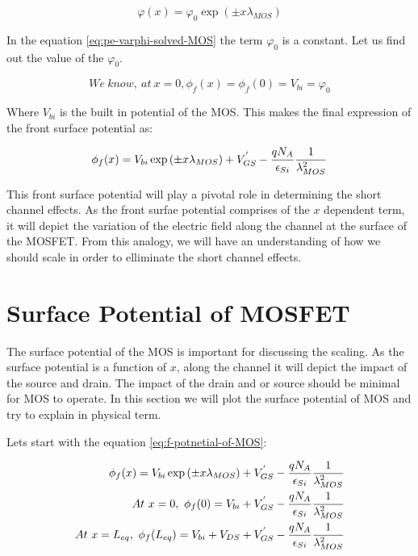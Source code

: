 \documentclass[a4paper]{article}
\begin{document}
\begin{equation}
  \label{eq:pe-varphi-solved-MOS}
  \varphi(x) = \varphi_0 \exp\left({\pm x \lambda_{MOS}}\right)
\end{equation}

In the equation \ref {eq:pe-varphi-solved-MOS} the term $\varphi_0$ is a constant. Let us find out the value of the $\varphi_0$.

\begin{equation}
  \label{eq:varphi-0-vbi}
  We~know,~at~x=0, \phi_f(x)=\phi_f(0)=V_{bi}=\varphi_0
\end{equation}

Where $V_{bi}$ is the built in potential of the MOS. This makes the final expression of the front surface potential as:

\begin{equation}
  \label{eq:f-potnetial-of-MOS}
  \phi_f(x) = V_{bi} \exp \left({\pm x \lambda_{MOS}}\right) + V_{GS}^{'} - \frac{qN_A} {\epsilon_{Si}} \frac{1}{\lambda_{MOS}^2}
\end{equation}

This front surface potential will play a pivotal role in determining the short channel effects. As the front surfae potential comprises of the $x$ dependent term, it will depict the variation of the electric field along the channel at the surface of the MOSFET. From this analogy, we will have an understanding of how we should scale in order to elliminate the short channel effects.

\section{Surface Potential of MOSFET}

The surface potential of the MOS is important for discussing the scaling. As the surface potential is a function of $x$, along the channel it will depict the impact of the source and drain. The impact of the drain and or source should be minimal for MOS to operate. In this section we will plot the surface potential of MOS and try to explain in physical term.

Lets start with the equation \ref{eq:f-potnetial-of-MOS}:

\begin{align*}
  \phi_f(x) = V_{bi} \exp \left({\pm x \lambda_{MOS}}\right) + V_{GS}^{'} - \frac{qN_A} {\epsilon_{Si}} \frac{1}{\lambda_{MOS}^2}\\
  At~x=0,~\phi_f(0) = V_{bi} + V_{GS}^{'} -\frac{qN_A} {\epsilon_{Si}} \frac{1}{\lambda_{MOS}^2}\\
  At~x=L_{eq},~\phi_f(L_{eq})  = V_{bi} + V_{DS} + V_{GS}^{'} -\frac{qN_A} {\epsilon_{Si}} \frac{1}{\lambda_{MOS}^2}
\end{align*}
\end{document}
